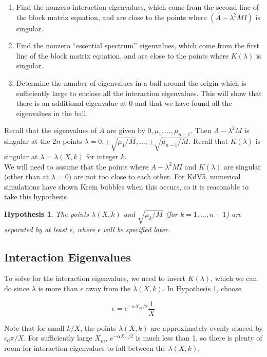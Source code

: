 \documentclass[12pt]{article}
\newtheorem{hypothesis}{Hypothesis}
\begin{document}
\begin{enumerate}
	\item Find the nonzero interaction eigenvalues, which come from the second line of the block matrix equation, and are close to the points where $(A - \lambda^2 M I)$ is singular.
	\item Find the nonzero ``essential spectrum'' eigenvalues, which come from the first line of the block matrix equation, and are close to the points where $K(\lambda)$ is singular.
	\item Determine the number of eigenvalues in a ball around the origin which is sufficiently large to enclose all the interaction eigenvalues. This will show that there is an additional eigenvalue at 0 and that we have found all the eigenvalues in the ball.
\end{enumerate}

Recall that the eigenvalues of $A$ are given by $0, \mu_1, \dots, \mu_{n-1}$. Then $A - \lambda^2 M$ is singular at the $2n$ points $\lambda = 0, \pm \sqrt{\mu_1/M}, \dots, \pm \sqrt{\mu_{n-1}/M}$. Recall that $K(\lambda)$ is singular at $\lambda = \lambda(X, k)$ for integer $k$.\\

We will need to assume that the points where $A - \lambda^2 M I$ and $K(\lambda)$ are singular (other than at $\lambda = 0$) are not too close to each other. For KdV5, numerical simulations have shown Krein bubbles when this occurs, so it is reasonable to take this hypothesis.

\begin{hypothesis}\label{epsilonballs}
The points $\lambda(X, k)$ and $\sqrt{\mu_k/M}$ (for $k = 1, \dots, n-1$) are separated by at least $\epsilon$, where $\epsilon$ will be specified later. 
\end{hypothesis}

\subsection{Interaction Eigenvalues}

To solve for the interaction eigenvalues, we need to invert $K(\lambda)$, which we can do since $\lambda$ is more than $\epsilon$ away from the $\lambda(X,k)$. In Hypothesis \ref{epsilonballs}, choose

\[
\epsilon = e^{-\alpha X_m/2} \frac{1}{X}
\]

Note that for small $k/X$, the points $\lambda(X, k)$ are approximately evenly spaced by $c_0 \pi/X$. For sufficiently large $X_m$, $e^{-\alpha X_m/2}$ is much less than 1, so there is plenty of room for interaction eigenvalues to fall between the $\lambda(X, k)$.\\
\end{document}
